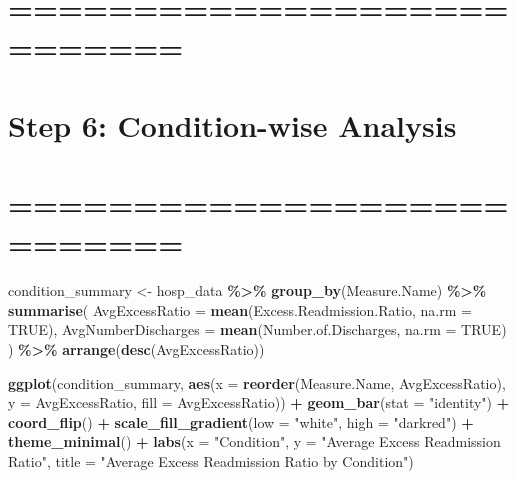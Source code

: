 \documentclass[
]{article}
\newenvironment{Shaded}{\begin{snugshade}}{\end{snugshade}}
\newcommand{\AttributeTok}[1]{\textcolor[rgb]{0.13,0.29,0.53}{#1}}
\newcommand{\ConstantTok}[1]{\textcolor[rgb]{0.56,0.35,0.01}{#1}}
\newcommand{\FunctionTok}[1]{\textcolor[rgb]{0.13,0.29,0.53}{\textbf{#1}}}
\newcommand{\NormalTok}[1]{#1}
\newcommand{\OtherTok}[1]{\textcolor[rgb]{0.56,0.35,0.01}{#1}}
\newcommand{\SpecialCharTok}[1]{\textcolor[rgb]{0.81,0.36,0.00}{\textbf{#1}}}
\newcommand{\StringTok}[1]{\textcolor[rgb]{0.31,0.60,0.02}{#1}}
\begin{document}
\section{===========================}\label{section-8}

\section{Step 6: Condition-wise
Analysis}\label{step-6-condition-wise-analysis}

\section{===========================}\label{section-9}

\begin{Shaded}
\begin{Highlighting}[]
\NormalTok{condition\_summary }\OtherTok{\textless{}{-}}\NormalTok{ hosp\_data }\SpecialCharTok{\%\textgreater{}\%}
\FunctionTok{group\_by}\NormalTok{(Measure.Name) }\SpecialCharTok{\%\textgreater{}\%}
\FunctionTok{summarise}\NormalTok{(}
\AttributeTok{AvgExcessRatio =} \FunctionTok{mean}\NormalTok{(Excess.Readmission.Ratio, }\AttributeTok{na.rm =} \ConstantTok{TRUE}\NormalTok{),}
\AttributeTok{AvgNumberDischarges =} \FunctionTok{mean}\NormalTok{(Number.of.Discharges, }\AttributeTok{na.rm =} \ConstantTok{TRUE}\NormalTok{)}
\NormalTok{) }\SpecialCharTok{\%\textgreater{}\%}
\FunctionTok{arrange}\NormalTok{(}\FunctionTok{desc}\NormalTok{(AvgExcessRatio))}

\FunctionTok{ggplot}\NormalTok{(condition\_summary, }\FunctionTok{aes}\NormalTok{(}\AttributeTok{x =} \FunctionTok{reorder}\NormalTok{(Measure.Name, AvgExcessRatio), }\AttributeTok{y =}\NormalTok{ AvgExcessRatio, }\AttributeTok{fill =}\NormalTok{ AvgExcessRatio)) }\SpecialCharTok{+}
\FunctionTok{geom\_bar}\NormalTok{(}\AttributeTok{stat =} \StringTok{"identity"}\NormalTok{) }\SpecialCharTok{+}
\FunctionTok{coord\_flip}\NormalTok{() }\SpecialCharTok{+}
\FunctionTok{scale\_fill\_gradient}\NormalTok{(}\AttributeTok{low =} \StringTok{"white"}\NormalTok{, }\AttributeTok{high =} \StringTok{"darkred"}\NormalTok{) }\SpecialCharTok{+}
\FunctionTok{theme\_minimal}\NormalTok{() }\SpecialCharTok{+}
\FunctionTok{labs}\NormalTok{(}\AttributeTok{x =} \StringTok{"Condition"}\NormalTok{, }\AttributeTok{y =} \StringTok{"Average Excess Readmission Ratio"}\NormalTok{,}
\AttributeTok{title =} \StringTok{"Average Excess Readmission Ratio by Condition"}\NormalTok{)}
\end{Highlighting}
\end{Shaded}
\end{document}
